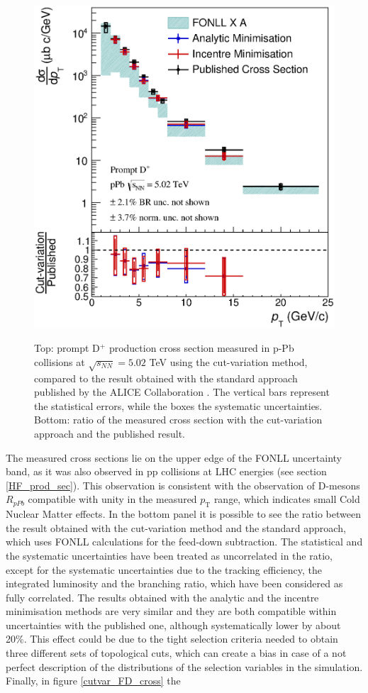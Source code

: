 \documentclass[b5paper,10pt,twoside,oldstyle,classica]{toptesi}
\newcommand{\pt}{p_\text{T}}
\begin{document}
\begin{figure}[tb]
\begin{center}
{\includegraphics[scale = 0.45]{CrossSectionPromptpPb.eps}}
\caption{Top: prompt D$^+$ production cross section measured in p-Pb collisions at $\sqrt{s_{NN}} = 5.02$ TeV using the cut-variation method, compared to the result obtained with the standard approach published by the ALICE Collaboration \cite{Abelev:2014hha}. The vertical bars represent the statistical errors, while the boxes the systematic uncertainties. Bottom: ratio of the measured cross section with the cut-variation approach and the published result.}
\label{cutvar_prompt_cross}
\end{center}
\end{figure} The measured cross sections lie on the upper edge of the FONLL uncertainty band, as it was also observed in pp collisions at LHC energies (see section \ref{HF_prod_sec}). This observation is consistent with the observation of D-mesons $R_{pPb}$ compatible with unity in the measured $\pt$ range, which indicates small Cold Nuclear Matter effects. In the bottom panel it is possible to see the ratio between the result obtained with the cut-variation method and the standard approach, which uses FONLL calculations for the feed-down subtraction. The statistical and the systematic uncertainties have been treated as uncorrelated in the ratio, except for the systematic uncertainties due to the tracking efficiency, the integrated luminosity and the branching ratio, which have been considered as fully correlated. The results obtained with the analytic and the incentre minimisation methods are very similar and they are both compatible within uncertainties with the published one, although systematically lower by about 20\%. This effect could be due to the tight selection criteria needed to obtain three different sets of topological cuts, which can create a bias in case of a not perfect description of the distributions of the selection variables in the simulation. Finally, in figure \ref{cutvar_FD_cross} the 
\end{document}
